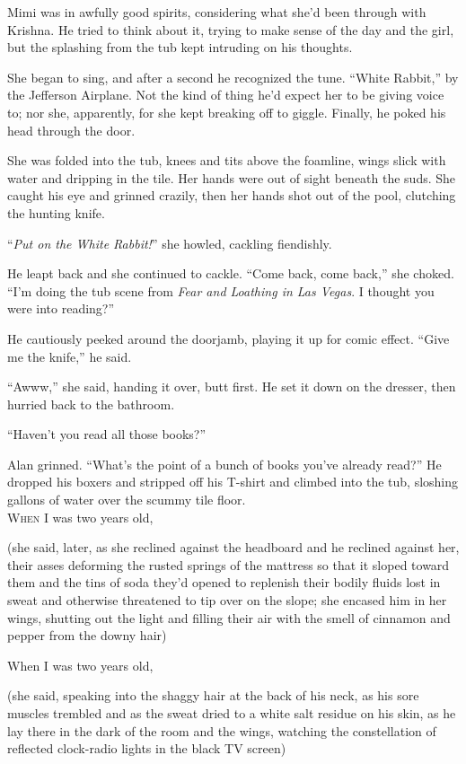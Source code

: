 Mimi was in awfully good spirits, considering what she'd been through
with Krishna.  He tried to think about it, trying to make sense of the
day and the girl, but the splashing from the tub kept intruding on his
thoughts.

She began to sing, and after a second he recognized the tune.  ``White
Rabbit,'' by the Jefferson Airplane.  Not the kind of thing he'd
expect her to be giving voice to; nor she, apparently, for she kept
breaking off to giggle.  Finally, he poked his head through the door.

She was folded into the tub, knees and tits above the foamline, wings
slick with water and dripping in the tile.  Her hands were out of
sight beneath the suds.  She caught his eye and grinned crazily, then
her hands shot out of the pool, clutching the hunting knife.

``\textit{Put on the White Rabbit!}'' she howled, cackling fiendishly.

He leapt back and she continued to cackle.  ``Come back, come back,''
she choked.  ``I'm doing the tub scene from \textit{Fear and Loathing
in Las Vegas}.  I thought you were into reading?''

He cautiously peeked around the doorjamb, playing it up for comic
effect.  ``Give me the knife,'' he said.

``Awww,'' she said, handing it over, butt first.  He set it down on
the dresser, then hurried back to the bathroom.

``Haven't you read all those books?''

Alan grinned.  ``What's the point of a bunch of books you've already
read?'' He dropped his boxers and stripped off his T-shirt and climbed
into the tub, sloshing gallons of water over the scummy tile floor.
\\
\lettrine[lines=3, lhang=.5, nindent=0pt, findent=2pt]{W}{hen} I was two years old,

(she said, later, as she reclined against the headboard and he
reclined against her, their asses deforming the rusted springs of the
mattress so that it sloped toward them and the tins of soda they'd
opened to replenish their bodily fluids lost in sweat and otherwise
threatened to tip over on the slope; she encased him in her wings,
shutting out the light and filling their air with the smell of
cinnamon and pepper from the downy hair)

When I was two years old,

(she said, speaking into the shaggy hair at the back of his neck, as
his sore muscles trembled and as the sweat dried to a white salt
residue on his skin, as he lay there in the dark of the room and the
wings, watching the constellation of reflected clock-radio lights in
the black TV screen)

